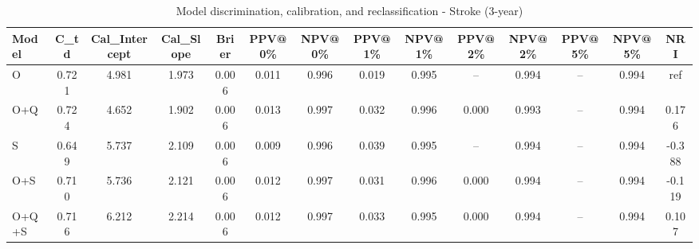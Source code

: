 \begin{table}[htbp]
\centering
\small
\caption{Model discrimination, calibration, and reclassification - Stroke (3-year)}
\label{tab:perf_stroke_3y}
\begin{tabular}{lccccccccccccc}
\toprule
Model & C\_td & Cal\_Intercept & Cal\_Slope & Brier & PPV@0\% & NPV@0\% & PPV@1\% & NPV@1\% & PPV@2\% & NPV@2\% & PPV@5\% & NPV@5\% & NRI \\
\midrule
O & 0.721 & 4.981 & 1.973 & 0.006 & 0.011 & 0.996 & 0.019 & 0.995 & -- & 0.994 & -- & 0.994 & ref \\
O+Q & 0.724 & 4.652 & 1.902 & 0.006 & 0.013 & 0.997 & 0.032 & 0.996 & 0.000 & 0.993 & -- & 0.994 & 0.176 \\
S & 0.649 & 5.737 & 2.109 & 0.006 & 0.009 & 0.996 & 0.039 & 0.995 & -- & 0.994 & -- & 0.994 & -0.388 \\
O+S & 0.710 & 5.736 & 2.121 & 0.006 & 0.012 & 0.997 & 0.031 & 0.996 & 0.000 & 0.994 & -- & 0.994 & -0.119 \\
O+Q+S & 0.716 & 6.212 & 2.214 & 0.006 & 0.012 & 0.997 & 0.033 & 0.995 & 0.000 & 0.994 & -- & 0.994 & 0.107 \\
\bottomrule
\end{tabular}
\end{table}